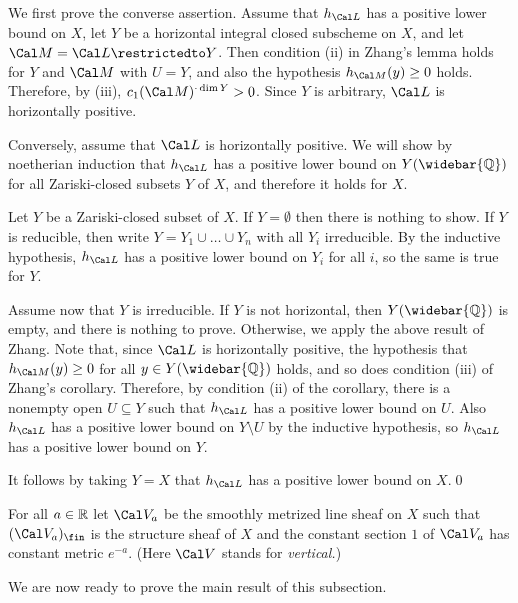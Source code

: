 
We first prove the converse assertion.  Assume that $h_{\Cal L}$ has a
positive lower bound on $X$, let $Y$ be a horizontal integral
closed subscheme on $X$, and let $\Cal M=\Cal L\restrictedto Y$.
Then condition (ii) in Zhang's lemma holds for $Y$ and $\Cal M$ with $U=Y$,
and also the hypothesis $h_{\Cal M}(y)\ge0$ holds.  Therefore, by (iii),
$c_1(\Cal M)^{\cdot\dim Y}>0$.  Since $Y$ is arbitrary, $\Cal L$ is
horizontally positive.

Conversely, assume that $\Cal L$ is horizontally positive.  We will show
by noetherian induction that $h_{\Cal L}$ has a positive lower bound
on $Y(\widebar{\Bbb Q})$ for all Zariski-closed subsets $Y$ of $X$,
and therefore it holds for $X$.

Let $Y$ be a Zariski-closed subset of $X$.  If $Y=\emptyset$ then
there is nothing to show.
If $Y$ is reducible, then write $Y=Y_1\cup\dots\cup Y_n$ with all $Y_i$
irreducible.  By the inductive hypothesis, $h_{\Cal L}$ has a
positive lower bound on $Y_i$ for all $i$, so the same is true for $Y$.

Assume now that $Y$ is irreducible.  If $Y$ is not horizontal,
then $Y(\widebar{\Bbb Q})$ is empty, and there is nothing to prove.
Otherwise, we apply the above result of Zhang.  Note that, since $\Cal L$
is horizontally positive, the hypothesis that $h_{\Cal M}(y)\ge0$
for all $y\in Y(\widebar{\Bbb Q})$ holds, and so does condition (iii)
of Zhang's corollary.
Therefore, by condition (ii) of the corollary, there is a nonempty open
$U\subseteq Y$ such that $h_{\Cal L}$ has a positive lower bound on $U$.
Also $h_{\Cal L}$ has a positive lower bound on $Y\setminus U$ by the
inductive hypothesis, so $h_{\Cal L}$ has a positive lower bound on $Y$.

It follows by taking $Y=X$ that $h_{\Cal L}$ has a positive lower bound
on $X$.\qed
\enddemo

  For all $a\in\Bbb R$ let $\Cal V_a$ be the smoothly
metrized line sheaf on $X$ such that $(\Cal V_a)_\fin$ is the structure sheaf
of $X$ and the constant section $1$ of $\Cal V_a$ has constant metric $e^{-a}$.
(Here $\Cal V$ stands for {\it vertical.})
\endit

We are now ready to prove the main result of this subsection.

